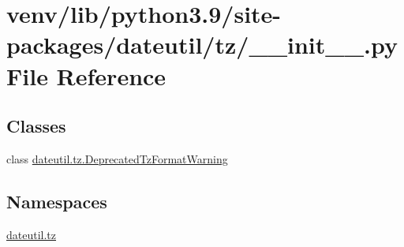 \hypertarget{venv_2lib_2python3_89_2site-packages_2dateutil_2tz_2____init_____8py}{}\section{venv/lib/python3.9/site-\/packages/dateutil/tz/\+\_\+\+\_\+init\+\_\+\+\_\+.py File Reference}
\label{venv_2lib_2python3_89_2site-packages_2dateutil_2tz_2____init_____8py}
\subsection*{Classes}
\begin{DoxyCompactItemize}
\item 
class \hyperlink{classdateutil_1_1tz_1_1DeprecatedTzFormatWarning}{dateutil.\+tz.\+Deprecated\+Tz\+Format\+Warning}
\end{DoxyCompactItemize}
\subsection*{Namespaces}
\begin{DoxyCompactItemize}
\item 
 \hyperlink{namespacedateutil_1_1tz}{dateutil.\+tz}
\end{DoxyCompactItemize}
